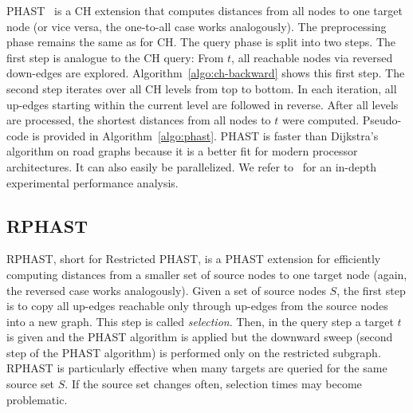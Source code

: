 \documentclass[manuscript,review]{acmart}
\begin{document}
PHAST~\cite{dgnw-phast-13} is a CH extension that computes distances from all nodes to one target node (or vice versa, the one-to-all case works analogously).
The preprocessing phase remains the same as for CH.
The query phase is split into two steps.
The first step is analogue to the CH query:
From $t$, all reachable nodes via reversed down-edges are explored.
Algorithm~\ref{algo:ch-backward} shows this first step.
The second step iterates over all CH levels from top to bottom.
In each iteration, all up-edges starting within the current level are followed in reverse.
After all levels are processed, the shortest distances from all nodes to $t$ were computed.
Pseudo-code is provided in Algorithm~\ref{algo:phast}.
PHAST is faster than Dijkstra's algorithm on road graphs because it is a better fit for modern processor architectures.
It can also easily be parallelized.
We refer to~\cite{dgnw-phast-13} for an in-depth experimental performance analysis.


\subsection{RPHAST}

RPHAST, short for Restricted PHAST, is a PHAST extension for efficiently computing distances from a smaller set of source nodes to one target node (again, the reversed case works analogously).
Given a set of source nodes $S$, the first step is to copy all up-edges reachable only through up-edges from the source nodes into a new graph.
This step is called \emph{selection}.
Then, in the query step a target $t$ is given and the PHAST algorithm is applied but the downward sweep (second step of the PHAST algorithm) is performed only on the restricted subgraph.
RPHAST is particularly effective when many targets are queried for the same source set $S$.
If the source set changes often, selection times may become problematic.
\end{document}
